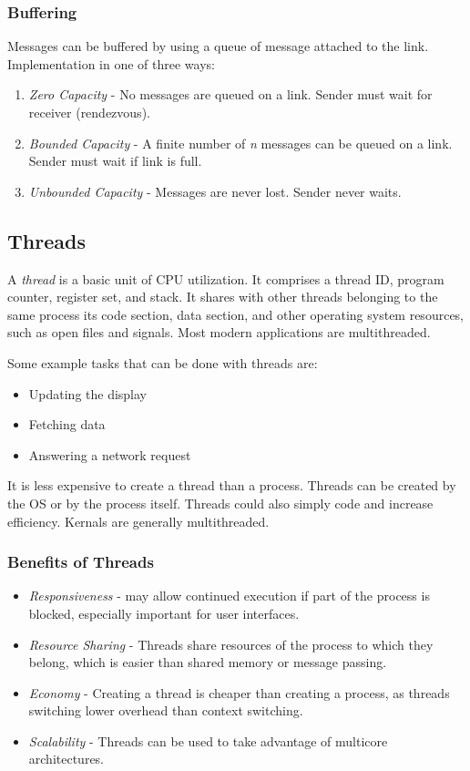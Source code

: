 \documentclass[]{article}
\begin{document}
\subsubsection*{Buffering}
Messages can be buffered by using a queue of message attached to the link. Implementation in one of three ways:
\begin{enumerate}
    \item \emph{Zero Capacity} - No messages are queued on a link. Sender must wait for receiver (rendezvous).
    \item \emph{Bounded Capacity} - A finite number of \emph{n} messages can be queued on a link. Sender must wait if link is full.
    \item \emph{Unbounded Capacity} - Messages are never lost. Sender never waits.
\end{enumerate}

\subsection{Threads}

A \emph{thread} is a basic unit of CPU utilization. It comprises a thread ID, program counter, register set, and stack. It shares with other threads belonging to the same process its code section, data section, and other operating system resources, such as open files and signals. Most modern applications are multithreaded.

Some example tasks that can be done with threads are:
\begin{itemize}
    \item Updating the display
    \item Fetching data
    \item Answering a network request
\end{itemize}

It is less expensive to create a thread than a process. Threads can be created by the OS or by the process itself. Threads could also simply code and increase efficiency. Kernals are generally multithreaded.

\subsubsection*{Benefits of Threads}

\begin{itemize}
    \item \emph{Responsiveness} - may allow continued execution if part of the process is blocked, especially important for user interfaces.
    \item \emph{Resource Sharing} - Threads share resources of the process to which they belong, which is easier than shared memory or message passing.
    \item \emph{Economy} - Creating a thread is cheaper than creating a process, as threads switching lower overhead than context switching.
    \item \emph{Scalability} - Threads can be used to take advantage of multicore architectures.
\end{itemize}
\end{document}
